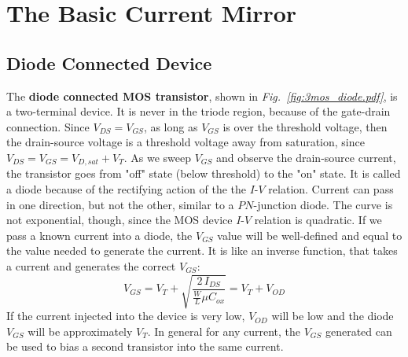 \section{The Basic Current Mirror}
\subsection{Diode Connected Device}
The \textbf{diode connected MOS transistor}, shown in \emph{Fig.~\ref{fig:3mos_diode.pdf}}, is a two-terminal device.  It is never in the triode region, because of the gate-drain connection.  Since $V_{DS} = V_{GS}$, as long as $V_{GS}$ is over the threshold voltage, then the drain-source voltage is a threshold voltage away from saturation, since $V_{DS} = V_{GS} = V_{D,sat} + V_T$.  As we sweep $V_{GS}$ and observe the drain-source current, the transistor goes from "off" state (below threshold) to the "on" state.  It is called a diode because of the rectifying action of the the $I$-$V$ relation. Current can pass in one direction, but not the other, similar to a $PN$-junction diode.  The curve is not exponential, though, since the MOS device $I$-$V$ relation is quadratic.  If we pass a known current into a diode, the $V_{GS}$ value will be well-defined and equal to the value needed to generate the current. It is like an inverse function, that takes a current and generates the correct $V_{GS}$:
    \begin{equation*}
        V_{GS} = V_T + \sqrt{\frac{2\,I_{DS}}{\frac{W}{L} \mu C_{ox}}} = V_T + V_{OD}
    \end{equation*}
If the current injected into the device is very low, $V_{OD}$ will be low and the diode $V_{GS}$ will be approximately $V_T$.  In general for any current, the $V_{GS}$ generated can be used to bias a second transistor into the same current.
\newpage
